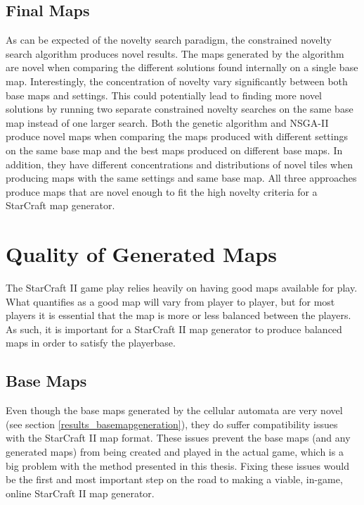 \subsection{Final Maps}
\label{discussion_novelty_finalmaps}
As can be expected of the novelty search paradigm, the constrained novelty search algorithm produces novel results. The maps generated by the algorithm are novel when comparing the different solutions found internally on a single base map. Interestingly, the concentration of novelty vary significantly between both base maps and settings. This could potentially lead to finding more novel solutions by running two separate constrained novelty searches on the same base map instead of one larger search. Both the genetic algorithm and NSGA-II produce novel maps when comparing the maps produced with different settings on the same base map and the best maps produced on different base maps. In addition, they have different concentrations and distributions of novel tiles when producing maps with the same settings and same base map. All three approaches produce maps that are novel enough to fit the high novelty criteria for a StarCraft map generator.

\section{Quality of Generated Maps}
\label{discussion_quality}
The StarCraft II game play relies heavily on having good maps available for play. What quantifies as a good map will vary from player to player, but for most players it is essential that the map is more or less balanced between the players. As such, it is important for a StarCraft II map generator to produce balanced maps in order to satisfy the playerbase.

\subsection{Base Maps}
\label{discussion_quality_basemaps}
Even though the base maps generated by the cellular automata are very novel (see section \ref{results_basemapgeneration}), they do suffer compatibility issues with the StarCraft II map format. These issues prevent the base maps (and any generated maps) from being created and played in the actual game, which is a big problem with the method presented in this thesis. Fixing these issues would be the first and most important step on the road to making a viable, in-game, online StarCraft II map generator.

